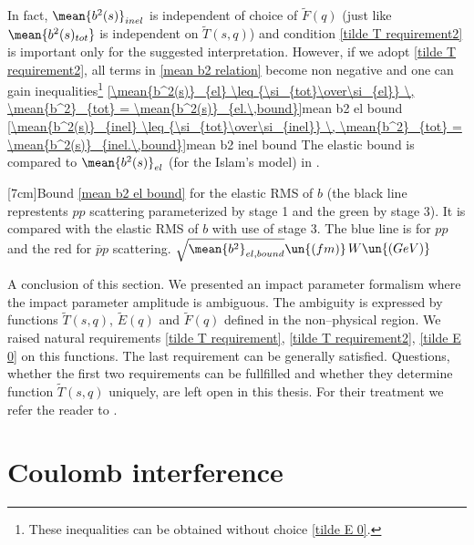 In fact, $\mean{b^2(s)}_{inel}$ is independent of choice of $\tilde F(q)$ (just like $\mean{b^2(s)_{tot}}$ is independent on $\tilde T(s, q)$) and condition \ref{tilde T requirement2} is important only for the suggested interpretation. However, if we adopt \ref{tilde T requirement2}, all terms in \ref{mean b2 relation} become non negative and one can gain inequalities\footnote{These inequalities can be obtained without choice \ref{tilde E 0}.}
\eqref{\mean{b^2(s)}_{el} \leq {\si_{tot}\over\si_{el}} \, \mean{b^2}_{tot} = \mean{b^2(s)}_{el.\,bound}}{mean b2 el bound}
\eqref{\mean{b^2(s)}_{inel} \leq {\si_{tot}\over\si_{inel}} \, \mean{b^2}_{tot} = \mean{b^2(s)}_{inel.\,bound}}{mean b2 inel bound}
The elastic bound is compared to $\mean{b^2(s)}_{el}$ (for the Islam's model) in \fg{} .

\bmfig
{}
{[7cm]Bound \ref{mean b2 el bound} for the elastic RMS of $b$ (the black line represtents $pp$ scattering para\-meterized by stage 1 and the green by stage 3). It is compared with the elastic RMS of $b$ with use of stage 3. The blue line is for $pp$ and the red for $\bar pp$ scattering.}
{$\sqrt{\mean{b^2}_{el, bound}}\un{(fm)}$}{$W\un{(GeV)}$}{}
\emfig

A conclusion of this section. We presented an impact parameter formalism where the impact parameter amplitude is ambiguous. The ambiguity is expressed by functions $\tilde T(s, q)$, $\tilde E(q)$ and $\tilde F(q)$ defined in the non--physical region. We raised natural requirements \ref{tilde T requirement}, \ref{tilde T requirement2}, \ref{tilde E 0} on this functions. The last requirement can be generally satisfied. Questions, whether the first two requirements can be fullfilled and whether they determine function $\tilde T(s, q)$ uniquely, are left open in this thesis. For their treatment we refer the reader to .



\section{Coulomb interference}

